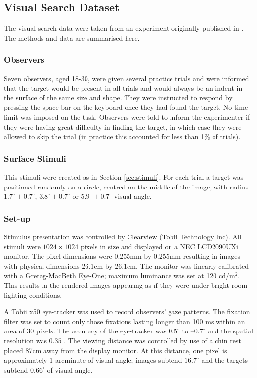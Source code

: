 \documentclass[preprint, authoryear]{elsarticle} %
\begin{document}
\subsection{Visual Search Dataset}

The visual search data were taken from an experiment originally published in \citet{clarke2009}. The methods and data are summarised here. 

\subsubsection{Observers}
Seven observers, aged 18-30, were given several practice trials and were informed that the target would be present in all trials and would always be an indent in the surface of the same size and shape. They were instructed to respond by pressing the space bar on the keyboard once they had found the target. No time limit was imposed on the task. Observers were told to inform the experimenter if they were having great difficulty in finding the target, in which case they were allowed to skip the trial (in practice this accounted for less than 1\% of trials). 

\subsubsection{Surface Stimuli}
This stimuli were created as in Section \ref{sec:stimuli}. For each trial a target was positioned randomly on a circle, centred on the middle of the image, with radius $1.7^{\circ} \pm 0.7^{\circ}$, $3.8^{\circ} \pm 0.7^{\circ}$ or $5.9^{\circ} \pm 0.7^{\circ}$ visual angle. 

\subsubsection{Set-up}
Stimulus presentation was controlled by Clearview (Tobii Technology Inc). All stimuli were $1024 \times 1024$ pixels in size and displayed on a NEC LCD2090UXi monitor. The pixel dimensions were 0.255mm by 0.255mm resulting in images with physical dimensions 26.1cm by 26.1cm. The monitor was linearly calibrated with a Gretag-MacBeth Eye-One; maximum luminance was set at 120 cd/m$^2$. This results in the rendered images appearing as if they were under bright room lighting conditions.

A Tobii x50 eye-tracker was used to record observers' gaze patterns. The fixation filter was set to count only those fixations lasting longer than 100 ms within an area of 30 pixels. The accuracy of the eye-tracker was $0.5^{\circ}$ to $–0.7^{\circ}$ and the spatial resolution was $0.35^{\circ}$. The viewing distance was controlled by use of a chin rest placed 87cm away from the display monitor. At this distance, one pixel is approximately 1 arcminute of visual angle; images subtend $16.7^{\circ}$ and the targets subtend $0.66^{\circ}$ of visual angle. 
\end{document}
